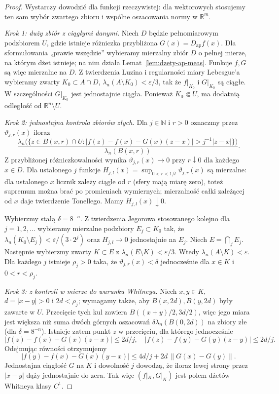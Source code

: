 \documentclass[11pt,a4paper,oneside]{book}
\numberwithin{equation}{chapter}
\theoremstyle{plain}
\theoremstyle{definition}
\theoremstyle{remark}
\begin{document}
\begin{proof}
Wystarczy dowodzić dla funkcji rzeczywistej: dla wektorowych
stosujemy ten sam wybór zwartego zbioru i wspólne
oszacowania normy w $\mathbb R^m$.

\emph{Krok 1: duży zbiór z ciągłymi danymi.}
Niech $D$ będzie pełnomiarowym podzbiorem $U$, gdzie
istnieje różniczka przybliżona $G(x)=D_{\mathrm{ap}}f(x)$.
Dla sformułowania „prawie wszędzie” wybieramy mierzalny
zbiór $D$ o pełnej mierze, na którym dżet istnieje;
na nim działa Lemat~\ref{lem:dzety-ap-meas}.
Funkcje $f,G$ są więc mierzalne na $D$. Z twierdzenia Luzina i regularności
miary Lebesgue'a wybieramy zwarty $K_0\subset A\cap D$,
$\lambda_n(A\setminus K_0)<\varepsilon/3$, tak że
$f|_{K_0}$ i $G|_{K_0}$ są ciągłe.
W szczególności $G|_{K_0}$ jest jednostajnie ciągła.
Ponieważ $K_0\Subset U$, ma dodatnią odległość od
$\mathbb R^n\setminus U$.

\emph{Krok 2: jednostajna kontrola zbiorów złych.}
Dla $j\in\mathbb N$ i $r>0$ oznaczmy przez
$\vartheta_{j,r}(x)$ iloraz
\[
 \frac{\lambda_n\bigl(\{z\in B(x,r)\cap U:
 |f(z)-f(x)-G(x)(z-x)|>j^{-1}|z-x|\}\bigr)}
 {\lambda_n(B(x,r))}.
\]
Z przybliżonej różniczkowalności wynika
$\vartheta_{j,r}(x)\to0$ przy $r\downarrow0$ dla
każdego $x\in D$. Dla ustalonego $j$ funkcje
$H_{j,l}(x)=\sup_{0<r<1/l}\vartheta_{j,r}(x)$ są
mierzalne: dla ustalonego $x$ licznik zależy ciągle
od $r$ (sfery mają miarę zero), toteż supremum można
brać po promieniach wymiernych; mierzalność całki
zależącej od $x$ daje twierdzenie Tonellego.
Mamy $H_{j,l}(x)\downarrow0$.

Wybierzmy stałą $\delta=8^{-n}$. Z twierdzenia Jegorowa
stosowanego kolejno dla $j=1,2,\ldots$ wybieramy
mierzalne podzbiory $E_j\subset K_0$ tak, że
$\lambda_n(K_0\setminus E_j)<\varepsilon/(3\cdot 2^j)$
oraz $H_{j,l}\to0$ jednostajnie na $E_j$.
Niech $E=\bigcap_j E_j$. Następnie wybierzmy zwarty
$K\subset E$ z $\lambda_n(E\setminus K)<\varepsilon/3$.
Wtedy $\lambda_n(A\setminus K)<\varepsilon$.
Dla każdego $j$ istnieje $\rho_j>0$ taka, że
$\vartheta_{j,r}(x)<\delta$ jednocześnie dla
$x\in K$ i $0<r<\rho_j$.

\emph{Krok 3: z kontroli w mierze do warunku Whitneya.}
Niech $x,y\in K$, $d=|x-y|>0$ i
$2d<\rho_j$; wymagamy także, aby $B(x,2d),B(y,2d)$
były zawarte w $U$. Przecięcie tych kul zawiera
$B((x+y)/2,3d/2)$, więc jego miara jest większa
niż suma dwóch górnych oszacowań
$\delta\lambda_n(B(0,2d))$ na zbiory złe
(dla $\delta=8^{-n}$). Istnieje zatem punkt $z$
w przecięciu, dla którego jednocześnie
\[
 |f(z)-f(x)-G(x)(z-x)|\le 2d/j,
 \quad |f(z)-f(y)-G(y)(z-y)|\le 2d/j.
\]
Odejmując równości otrzymujemy
\[
 |f(y)-f(x)-G(x)(y-x)|
 \le4d/j+2d\,\|G(x)-G(y)\|.
\]
Jednostajna ciągłość $G$ na $K$ i dowolność $j$
dowodzą, że iloraz lewej strony przez $|x-y|$
dąży jednostajnie do zera. Tak więc $(f|_K,G|_K)$
jest polem dżetów Whitneya klasy $C^1$.


\end{proof}
\end{document}
